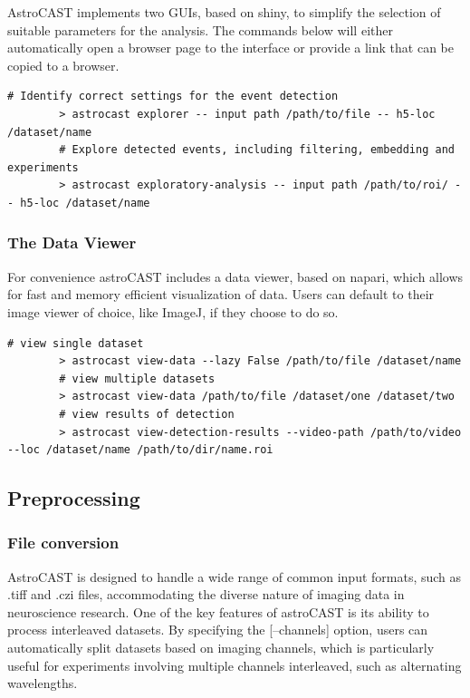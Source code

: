 \documentclass[utf8]{FrontiersinHarvard}
\newcommand{\inlineBash}[1]{%
    \begingroup
    \edef\temp{#1}%
    \expandafter\StrSubstitute\expandafter{\temp}{--}{-{-}}[\temp]%
    \tcbox[on line, boxsep=0pt, left=1pt, right=1pt, top=1pt, bottom=1pt,
        boxrule=0pt, arc=0pt, outer arc=0pt, colback=lightgray]{
        \texttt{\small \temp}
    }%
    \endgroup
}
\newcommand{\inlinepy}[1]{\inlineBash{#1}}
\begin{document}
    AstroCAST implements two \ac{GUI}s, based on shiny\citep{chang_shiny_2024}, to simplify the selection of suitable parameters for the analysis. The commands below will either automatically open a browser page to the interface or provide a link that can be copied to a browser.

    \begin{lstlisting}[style=bashStyle]
        # Identify correct settings for the event detection
        > astrocast explorer -- input path /path/to/file -- h5-loc /dataset/name
        # Explore detected events, including filtering, embedding and experiments
        > astrocast exploratory-analysis -- input path /path/to/roi/ -- h5-loc /dataset/name
    \end{lstlisting}

    \subsubsection{The Data Viewer}

    For convenience astroCAST includes a data viewer, based on napari\citep{sofroniew_nicholas_napari_2022}, which allows for fast and memory efficient visualization of data. Users can default to their image viewer of choice, like ImageJ, if they choose to do so.

    \begin{lstlisting}[style=bashStyle]
        # view single dataset
        > astrocast view-data --lazy False /path/to/file /dataset/name
        # view multiple datasets
        > astrocast view-data /path/to/file /dataset/one /dataset/two
        # view results of detection
        > astrocast view-detection-results --video-path /path/to/video --loc /dataset/name /path/to/dir/name.roi
    \end{lstlisting}

    \subsection{Preprocessing}

    \subsubsection{File conversion}

    AstroCAST is designed to handle a wide range of common input formats, such as .tiff and .czi files, accommodating the diverse nature of imaging data in neuroscience research. One of the key features of astroCAST is its ability to process interleaved datasets. By specifying the \inlinepy{--channels} option, users can automatically split datasets based on imaging channels, which is particularly useful for experiments involving multiple channels interleaved, such as alternating wavelengths.
\end{document}
